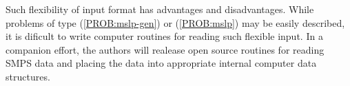 Such flexibility of input format has advantages and disadvantages.  While problems of type (\ref{PROB:mslp-gen}) or (\ref{PROB:mslp}) may be easily described, it is dificult to write computer routines for reading such flexible input.  In a companion effort, the authors will realease open source routines for reading SMPS data and placing the data into appropriate internal computer data structures.
